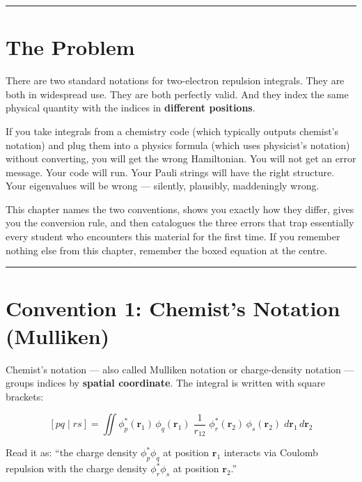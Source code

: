 \documentclass[
  11pt,
  oneside]{book}
\begin{document}
\begin{center}\rule{0.5\linewidth}{0.5pt}\end{center}

\section{The Problem}\label{the-problem}

There are two standard notations for two-electron repulsion integrals.
They are both in widespread use. They are both perfectly valid. And they
index the same physical quantity with the indices in \textbf{different
positions}.

If you take integrals from a chemistry code (which typically outputs
chemist's notation) and plug them into a physics formula (which uses
physicist's notation) without converting, you will get the wrong
Hamiltonian. You will not get an error message. Your code will run. Your
Pauli strings will have the right structure. Your eigenvalues will be
wrong --- silently, plausibly, maddeningly wrong.

This chapter names the two conventions, shows you exactly how they
differ, gives you the conversion rule, and then catalogues the three
errors that trap essentially every student who encounters this material
for the first time. If you remember nothing else from this chapter,
remember the boxed equation at the centre.

\begin{center}\rule{0.5\linewidth}{0.5pt}\end{center}

\section{Convention 1: Chemist's Notation
(Mulliken)}\label{convention-1-chemists-notation-mulliken}

Chemist's notation --- also called Mulliken notation or charge-density
notation --- groups indices by \textbf{spatial coordinate}. The integral
is written with square brackets:

\[[pq \mid rs] = \iint \phi_p^*(\mathbf{r}_1)\,\phi_q(\mathbf{r}_1)\;\frac{1}{r_{12}}\;\phi_r^*(\mathbf{r}_2)\,\phi_s(\mathbf{r}_2)\;d\mathbf{r}_1\,d\mathbf{r}_2\]

Read it as: ``the charge density \(\phi_p^* \phi_q\) at position
\(\mathbf{r}_1\) interacts via Coulomb repulsion with the charge density
\(\phi_r^* \phi_s\) at position \(\mathbf{r}_2\).''
\end{document}
